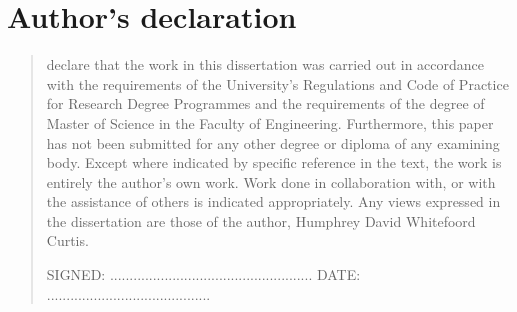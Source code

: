 %
%
%
%
%
%
\chapter*{Author's declaration}
\begin{SingleSpace}
\begin{quote}
 declare that the work in this dissertation was carried out in accordance with the requirements of the University's Regulations and Code of Practice for Research Degree Programmes and the requirements of the degree of Master of Science in the Faculty of Engineering. Furthermore, this paper has not been submitted for any other degree or diploma of any examining body. Except where indicated by specific reference in the text, the work is entirely the author's own work. Work done in collaboration with, or with the assistance of others is indicated appropriately. Any views expressed in the dissertation are those of the author, Humphrey David Whitefoord Curtis. 

\vspace{1.5cm}
\noindent
\hspace{-0.75cm}\textsc{SIGNED: .................................................... DATE: ..........................................}
\end{quote}
\end{SingleSpace}
\clearpage